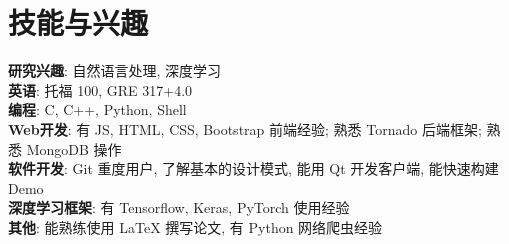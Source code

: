 \section{技能与兴趣}
\textbf{研究兴趣}: 自然语言处理, 深度学习\\
\textbf{英语}: 托福 100, GRE 317+4.0\\
\textbf{编程}: C, C++, Python, Shell\\
\textbf{Web开发}: 有 JS, HTML, CSS, Bootstrap 前端经验; 熟悉 Tornado 后端框架; 熟悉 MongoDB 操作\\
\textbf{软件开发}: Git 重度用户, 了解基本的设计模式, 能用 Qt 开发客户端, 能快速构建 Demo\\
\textbf{深度学习框架}: 有 Tensorflow, Keras, PyTorch 使用经验\\
\textbf{其他}: 能熟练使用 LaTeX 撰写论文, 有 Python 网络爬虫经验\\

